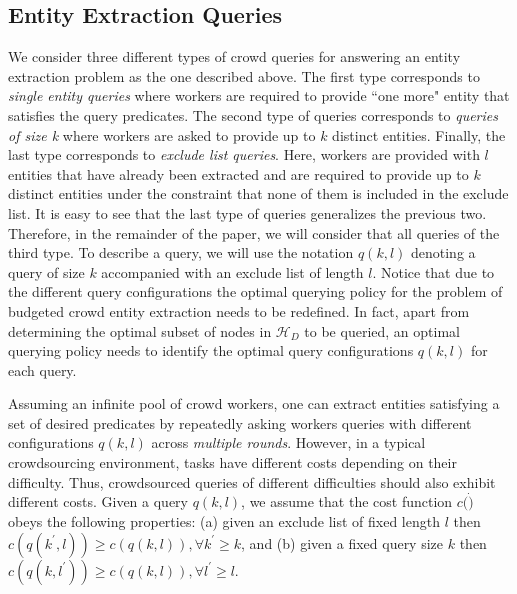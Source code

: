 \documentclass{sig-alternate}
\newcommand{\hierarchy}{\mathcal{H}_D}
\begin{document}
\subsection{Entity Extraction Queries}
\label{sec:queries}
We consider three different types of crowd queries for answering an entity extraction problem as the one described above. The first type corresponds to {\em single entity queries} where workers are required to provide ``one more" entity that satisfies the query predicates. The second type of queries corresponds to {\em queries of  size k} where workers are asked to provide up to $k$ distinct entities. Finally, the last type corresponds to {\em exclude list queries}. Here,  workers are provided with $l$ entities that have already been extracted and are required to provide up to $k$ distinct entities under the constraint that none of them is included in the exclude list. It is easy to see that the last type of queries generalizes the previous two. Therefore, in the remainder of the paper, we will consider that all queries of the third type. To describe a query, we will use the notation $q(k,l)$ denoting a query of size $k$ accompanied with an exclude list of length $l$. Notice that due to the different query configurations the optimal querying policy for the problem of budgeted crowd entity extraction needs to be redefined. In fact, apart from determining the optimal subset of nodes in $\hierarchy$ to be queried, an optimal querying policy needs to identify the optimal query configurations $q(k,l)$ for each query.

Assuming an infinite pool of crowd workers,  one can extract entities satisfying a set of desired predicates by repeatedly asking workers queries with different configurations $q(k,l)$ across {\em multiple rounds}. However, in a typical crowdsourcing environment, tasks have different costs depending on their difficulty. Thus, crowdsourced queries of different difficulties should also exhibit different costs. Given a query $q(k,l)$, we assume that the cost function $c(\dot)$ obeys the following properties: (a) given an exclude list of fixed length $l$ then $c(q(k^{\prime},l)) \geq c(q(k,l)),  \forall k^{\prime} \geq k$, and (b) given a fixed query size $k$ then $c(q(k,l^{\prime})) \geq c(q(k,l)), \forall l^{\prime} \geq l$. 
\end{document}
